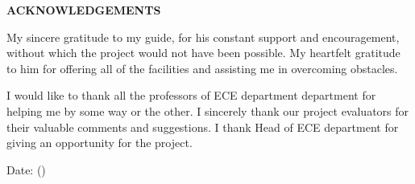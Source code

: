 \clearpage
\begin{centering}
\textbf{\Large ACKNOWLEDGEMENTS}\\
\vspace{\baselineskip}
\end{centering}

My sincere gratitude to my guide, for his constant support and encouragement, without which the project would not have been possible.  My heartfelt gratitude to him for offering all of the facilities and assisting me in overcoming obstacles.
\par{
I would like to thank all the professors of ECE department department for helping me by some way or the other. I sincerely thank our project evaluators for their valuable comments and suggestions. I thank Head of ECE department for giving an opportunity for the project.
}

\vspace{4mm}
\noindent
Date: \sumbissionDate
\mbox{}\hfill \yourName (\yourEnrollmentNumber)
